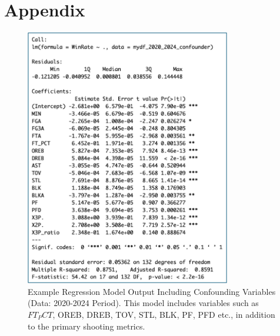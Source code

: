 \documentclass[11pt, a4paper]{article} %
\begin{document}


\newpage
{} %

\section*{Appendix}

\begin{figure}[htbp] %
    \centering %
    \includegraphics[width=0.8\textwidth]{figure/confounder_model_appendix.png} 
    \caption{Example Regression Model Output Including Confounding Variables (Data: 2020-2024 Period). This model includes variables such as $FT_PCT$, OREB, DREB, TOV, STL, BLK, PF, PFD etc., in addition to the primary shooting metrics.}
    \label{fig:confounder_model_appendix} %
\end{figure}
\end{document}
